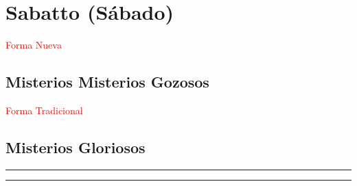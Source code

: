 \documentclass[10pt,twoside]{book}
\begin{document}
\section*{\centering Sabatto (Sábado)}

\begin{paracol}{2}
      \begin{leftcolumn}
            \begin{center}
                  \textcolor{red}{Forma Nueva}
                  \subsection*{Misterios Misterios Gozosos}
            \end{center}
             
            

      \end{leftcolumn}
      \begin{rightcolumn}
            \begin{center}
                  \textcolor{red}{Forma Tradicional}
                  \subsection*{Misterios Gloriosos}
            \end{center}                  
                  
            
      \end{rightcolumn}
\end{paracol}

\begin{center}
      {\rule{20em}{0.4pt}}
\end{center}



\begin{center}
      {\rule{20em}{0.4pt}}
\end{center}
\end{document}
